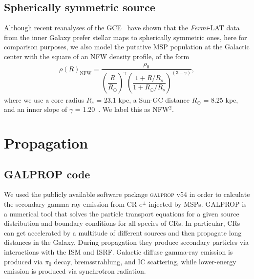 \documentclass[doublespace,nopageskip]{VTthesis} %
\begin{document}
\subsection{Spherically symmetric source}\label{sec:NFW}

Although recent reanalyses of the GCE~\cite{2018NatAs...2..387M,2018NatAs...2..819B} have shown that the \textit{Fermi}-LAT data from the inner Galaxy prefer stellar maps to spherically symmetric ones, here for comparison purposes, we also model the putative MSP population at the Galactic center with the square of an NFW density profile, of the form
\begin{eqnarray}\label{eq:NFW_2}
  \rho(R)_{\text{NFW}} = \dfrac{\rho_0}{\left(\dfrac{R}{R_\odot}\right)^\gamma\left(\dfrac{1+R/R_s}{1+R_\odot/R_s}\right)^{(3-\gamma)}},
\end{eqnarray}
where we use a core radius $R_s$ = 23.1 kpc, a Sun-GC distance $R_\odot$ = 8.25 kpc, and an inner slope of $\gamma$ = 1.20~\cite{2012PhRvD..86h3511A,2014PhRvD..89f3515M}. We label this as NFW$^2$.

\section{Propagation}\label{sec:prop}

\subsection{GALPROP code}\label{sec:galprop}

We used the publicly available software package \textsc{galprop} v54 in order to calculate the secondary gamma-ray emission from CR $e^\pm$ injected by MSPs. GALPROP is a numerical tool that solves the particle transport equations for a given source distribution and boundary conditions for all species of CRs. In particular, CRs can get accelerated by a multitude of different sources and then propagate long distances in the Galaxy. During propagation they produce secondary particles via interactions with the ISM and ISRF. Galactic diffuse gamma-ray emission is produced via $\pi_0$ decay, bremsstrahlung, and IC scattering, while lower-energy emission is produced via synchrotron radiation.
\end{document}
